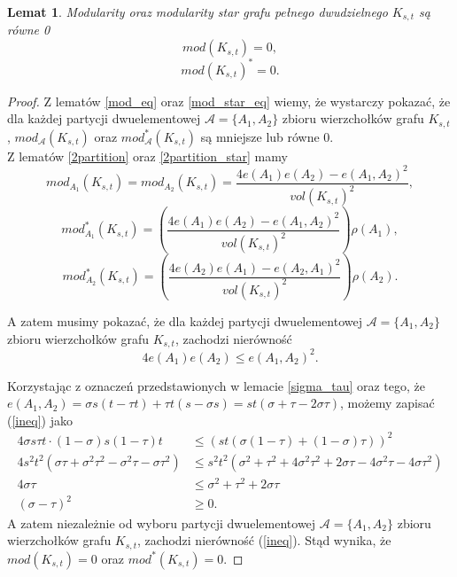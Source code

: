 \documentclass[letterpaper,12pt]{article}
\newtheorem{lemma}{Lemat}
\begin{document}
\begin{lemma}
  \cite[Theorem 3.1]{MS23}
  \label{bipartite_mod}
  Modularity oraz modularity star grafu pełnego dwudzielnego \(K_{s,t}\) są równe 0
  \[mod(K_{s,t}) = 0,\]
  \[mod(K_{s,t})^* = 0.\]
\end{lemma}

\begin{proof}
  Z lematów \ref{mod_eq} oraz \ref{mod_star_eq} wiemy, że wystarczy pokazać, że dla każdej partycji dwuelementowej \(\mathcal{A} = \{A_1, A_2\}\) zbioru wierzchołków grafu \(K_{s,t}\), \(mod_{\mathcal{A}}(K_{s,t})\) oraz \(mod_{\mathcal{A}}^*(K_{s,t})\) są mniejsze lub równe 0.\\
  Z lematów \ref{2partition} oraz \ref{2partition_star} mamy
  \[mod_{A_1}(K_{s,t}) = mod_{A_2}(K_{s,t}) = \frac{4e(A_1)e(A_2)-e(A_1,A_2)^2}{vol(K_{s,t})^2},\]
  \[mod^*_{A_1}(K_{s,t}) = \left(\frac{4e(A_1)e(A_2)-e(A_1,A_2)^2}{vol(K_{s,t})^2}\right) \rho(A_1),\]
  \[mod^*_{A_2}(K_{s,t}) = \left(\frac{4e(A_2)e(A_1)-e(A_2,A_1)^2}{vol(K_{s,t})^2}\right) \rho(A_2).\]

  A zatem musimy pokazać, że dla każdej partycji dwuelementowej \(\mathcal{A} = \{A_1, A_2\}\) zbioru wierzchołków grafu \(K_{s,t}\), zachodzi nierówność
  \[4e(A_1)e(A_2) \leq e(A_1,A_2)^2. \label{ineq} \tag{1}\]

  Korzystając z oznaczeń przedstawionych w lemacie \ref{sigma_tau} oraz tego, że \\\(e(A_1,A_2) = \sigma s (t-\tau t)+\tau t(s-\sigma s) = st(\sigma + \tau - 2\sigma \tau)\), możemy zapisać (\ref{ineq}) jako
  \begin{align*}
    4\sigma s \tau t \cdot (1-\sigma)s(1-\tau)t                          & \leq (s t (\sigma(1-\tau) + (1-\sigma)\tau))^2                                         \\
    4s^2t^2(\sigma \tau+\sigma^2 \tau^2 - \sigma^2 \tau - \sigma \tau^2) & \leq s^2t^2(\sigma^2 + \tau^2+4\sigma^2\tau^2+2\sigma\tau-4\sigma^2\tau-4\sigma\tau^2) \\
    4\sigma\tau                                                          & \leq \sigma^2 + \tau^2 + 2\sigma\tau                                                   \\
    (\sigma - \tau)^2                                                    & \geq 0.
  \end{align*}
  A zatem niezależnie od wyboru partycji dwuelementowej \(\mathcal{A} = \{A_1, A_2\}\) zbioru wierzchołków grafu \(K_{s,t}\), zachodzi nierówność (\ref{ineq}). Stąd wynika, że \(mod(K_{s,t}) = 0\) oraz \(mod^*(K_{s,t}) = 0\).
\end{proof}
\end{document}
